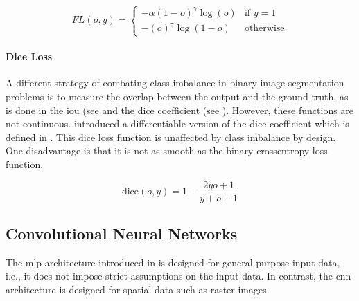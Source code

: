 \begin{equation}
\label{eq:focal}
FL(o,y)=\begin{cases}  -\alpha(1-o)^\gamma \log(o) &\text{if $y = 1$}\\
 -(o)^\gamma \log(1-o) &\text{otherwise}\end{cases}
\end{equation}

\paragraph{Dice Loss}
\label{p:dice.loss}
A different strategy of combating class imbalance in binary image segmentation problems is to measure the overlap between the output and the ground truth, as is done in the \gls{iou} (see  and the dice coefficient (see ). However, these functions are not continuous. \citep{DBLP:conf/3dim/MilletariNA16} introduced a differentiable version of the dice coefficient which is defined in . This dice loss function is unaffected by class imbalance by design. One disadvantage is that it is not as smooth as the binary-crossentropy loss function.

\begin{equation}
\label{eq:dice}
    \text{dice}(o,y)=1-\frac{2yo+1}{y+o+1}
\end{equation}


\subsection{Convolutional Neural Networks}
\label{subsec:bg.cnn}

The \gls{mlp} architecture introduced in  is designed for general-purpose input data, i.e., it does not impose strict assumptions on the input data. In contrast, the \gls{cnn} architecture \citep{DBLP:journals/pr/FukushimaM82,10.1162/neco.1989.1.4.541} is designed for spatial data such as raster images.

